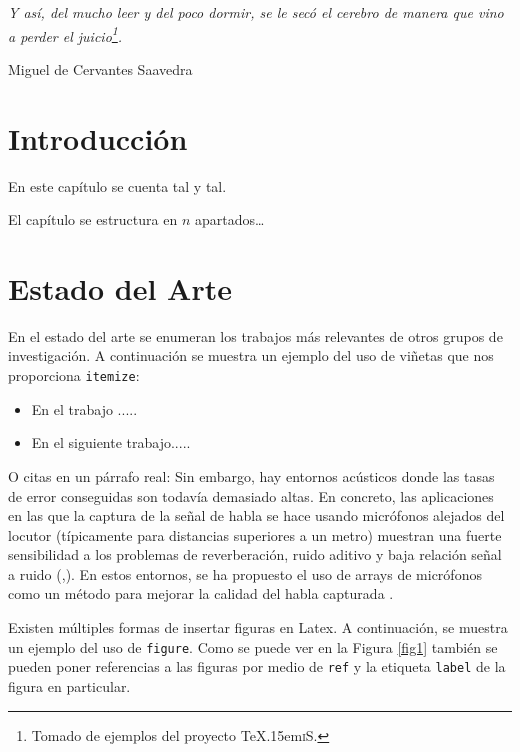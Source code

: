 \documentclass[spanish,openright]{book}
\def\texis{\TeX \raise.15em\hbox{\textsc{i}}S}
\newenvironment{FraseCelebre}{\begin{list}{}{\setlength{\leftmargin}{0.5\textwidth}\setlength{\parsep}{0cm}\addtolength{\topsep}{0.5cm}}
  }
  {\unskip \end{list}}
\newenvironment{Frase}{\item \begin{flushright}\small\em}{\end{flushright}}
\newenvironment{Fuente}{\item \begin{flushright}\small}{\end{flushright}}
\begin{document}
\begin{FraseCelebre}
  \begin{Frase}
    Y así, del mucho leer y del poco dormir, se le secó el cerebro de
    manera que vino a perder el juicio\footnote{Tomado de ejemplos del
      proyecto \texis{}.}.
  \end{Frase}
  \begin{Fuente}
    Miguel de Cervantes Saavedra
  \end{Fuente}
\end{FraseCelebre}


\section{Introducción}
\label{sec:introduccion-teoria}

En este capítulo se cuenta tal y tal.

El capítulo se estructura en $n$ apartados\ldots


\section{Estado del Arte}
\label{sec:estadoarte}

En el estado del arte se enumeran los trabajos más relevantes de otros
grupos de investigación. A continuación se muestra un ejemplo del uso de
viñetas que nos proporciona \texttt{itemize}:

\begin{itemize}
\item En el trabajo ..... 
\item En el siguiente trabajo.....
\end{itemize}

O citas en un párrafo real: Sin embargo, hay entornos acústicos donde
las tasas de error conseguidas son todavía demasiado altas. En concreto,
las aplicaciones en las que la captura de la señal de habla se hace
usando micrófonos alejados del locutor (típicamente para distancias
superiores a un metro) muestran una fuerte sensibilidad a los problemas
de reverberación, ruido aditivo y baja relación señal a ruido
(\cite{gelbart02},\cite{kochkin02}). En estos entornos, se ha propuesto
el uso de arrays de micrófonos como un método para mejorar la calidad
del habla capturada \cite{seltzer03}\cite{herbordt05}.

Existen múltiples formas de insertar figuras en Latex. A continuación,
se muestra un ejemplo del uso de \texttt{figure}. Como se puede ver en
la Figura \ref{fig1} también se pueden poner referencias a las figuras
por medio de \texttt{ref} y la etiqueta \texttt{label} de la figura en
particular.
\end{document}
